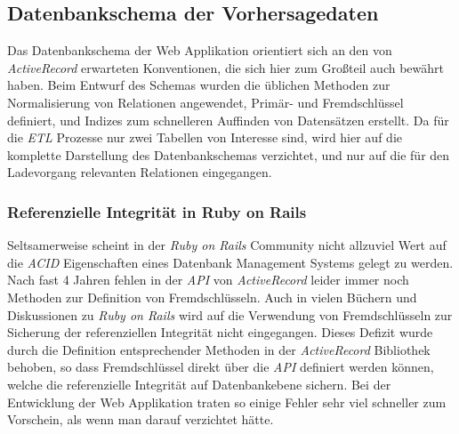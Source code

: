 \subsection{Datenbankschema der Vorhersagedaten}
Das Datenbankschema der Web Applikation orientiert sich an den von
\textit{ActiveRecord} erwarteten Konventionen, die sich hier zum
Großteil auch bewährt haben. Beim Entwurf des Schemas wurden die
üblichen Methoden zur Normalisierung von Relationen angewendet,
Primär- und Fremdschlüssel definiert, und Indizes zum schnelleren
Auffinden von Datensätzen erstellt. Da für die \textit{ETL} Prozesse
nur zwei Tabellen von Interesse sind, wird hier auf die komplette
Darstellung des Datenbankschemas verzichtet, und nur auf die für den
Ladevorgang relevanten Relationen eingegangen.

\subsubsection{Referenzielle Integrität in Ruby on Rails}
Seltsamerweise scheint in der \textit{Ruby on Rails} Community nicht
allzuviel Wert auf die \textit{ACID}  Eigenschaften eines Datenbank
Management Systems gelegt zu werden. Nach fast 4 Jahren fehlen in der
\textit{API} von \textit{ActiveRecord} leider immer noch Methoden zur
Definition von Fremdschlüsseln. Auch in vielen Büchern und
Diskussionen zu \textit{Ruby on Rails} wird auf die Verwendung von
Fremdschlüsseln zur Sicherung der referenziellen Integrität nicht
eingegangen. Dieses Defizit wurde durch die Definition entsprechender
Methoden in der \textit{ActiveRecord} Bibliothek behoben, so dass
Fremdschlüssel direkt über die \textit{API} definiert werden können,
welche die referenzielle Integrität auf Datenbankebene sichern. Bei
der Entwicklung der Web Applikation traten so einige Fehler sehr viel
schneller zum Vorschein, als wenn man darauf verzichtet hätte.

